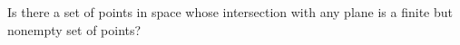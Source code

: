 Is there a set of points in space whose intersection with any plane is a finite but nonempty set of points?